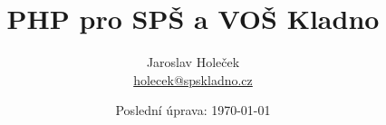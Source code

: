 \documentclass[10pt,a4paper]{article}
\author{Jaroslav Holeček\\ \href{mailto:holecek@spskladno.cz}{holecek@spskladno.cz}}
\title{PHP pro SPŠ a VOŠ Kladno}
\date{Poslední úprava: \today}
\begin{document}
\doclicenseThis
\maketitle
\tableofcontents









\end{document}
